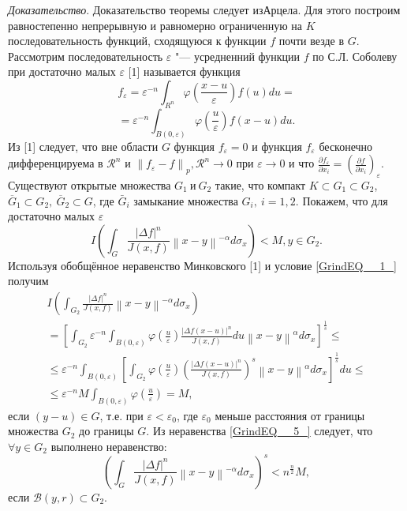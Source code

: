 \textit{Доказательство}. Доказательство теоремы следует из Арцела. Для этого построим равностепенно непрерывную и равномерно ограниченную на $K$ последовательность функций,
сходящуюся к функции $f$ почти везде в $G$. Рассмотрим последовательность $\varepsilon$ "--- усредненний функции $f$ по С.Л. Соболеву при достаточно малых $\varepsilon$ [1] называется функция 
$$
f_{\varepsilon } =\varepsilon ^{-n} \int _{R^{n} }\varphi \left(\frac{x-u}{\varepsilon } \right) f\left(u\right)du=
$$
$$
=\varepsilon ^{-n} \int _{B\left(0,\varepsilon \right)}\varphi \left(\frac{u}{\varepsilon } \right) f\left(x-u\right)du.
$$
Из [1] следует, что вне области $G$ функция $f_{\varepsilon }=0$ и функция $f_{\varepsilon }$ бесконечно дифференцируема в
${\mathcal{R}}^n$ и ${\left\|f_{\varepsilon }-f\right\|}_p,{\mathcal{R}}^n\rightarrow0$ при $\varepsilon \rightarrow0$ и что
$\frac{\partial f_{\varepsilon } }{\partial x_{i} } =\left(\frac{\partial f}{\partial x_{i} } \right)_{\varepsilon } $.
Существуют открытые множества $G_1\ \textrm{и}\ G_2$ такие, что компакт $K\subset G_1\subset G_2$, ${\overline{G}}_1\subset G_2,\ {\overline{G}}_2\subset G$,
где $\bar{G}_{i} $ замыкание множества $G_i,\ i=1,2.$ Покажем, что для достаточно малых $\varepsilon$
$$
I\left(\int _{G}\frac{\left|\Delta f\right|^{n} }{J\left(x,f\right)} \left\| x-y\right\| ^{-\alpha }  d\sigma _{x} \right)<M,y\in G_{2}.
$$
Используя обобщённое неравенство Минковского [1] и условие \ref{GrindEQ__1_} получим 
\begin{equation}\label{GrindEQ__5_} 
    \begin{gathered}
        I\left(\int _{G_{2} }\frac{\left|\Delta f\right|^{n} }{J\left(x,f\right)} \left\| x-y\right\| ^{-\alpha }  d\sigma _{x} \right) \\
        =\left[\int _{G_{2} }\varepsilon ^{-n} \int _{B\left(0,\varepsilon \right)}\varphi \left(\frac{u}{\varepsilon } \right)
        \frac{\left|\Delta f\left(x-u\right)\right|^{n} }{J\left(x,f\right)} du\left\| x-y\right\| ^{\alpha } d\sigma _{x}  \right]^{\frac{1}{s} } \leqslant \\
        \leqslant \varepsilon ^{-n}\!\!\int _{B\left(0,\varepsilon \right)}\left[\int _{G_{2} }\varphi \left(\frac{u}{\varepsilon } \right)
        \left(\frac{\left|\Delta f\left(x-u\right)\right|^{n} }{J\left(x,f\right)} \right)^{s} \left\| x-y\right\| ^{\alpha } d\sigma _{x} \right]^{\frac{1}{s}}\!du\!\leqslant \\
        \leqslant \varepsilon ^{-n} M\int _{B\left(0,\varepsilon \right)}\varphi \left(\frac{u}{\varepsilon } \right) =M,
    \end{gathered}
\end{equation}
если $\left(y-u\right)\in G$, т.е. при $\varepsilon <{\varepsilon }_0$, где ${\varepsilon }_0$ меньше расстояния от границы множества $G_2$ до границы $G$.
Из неравенства \ref{GrindEQ__5_} следует, что $\forall y\in G_2$ выполнено неравенство:
$$
\left(\int _{G}\frac{\left|\Delta f\right|^{n} }{J\left(x,f\right)} \left\| x-y\right\| ^{-\alpha }  d\sigma _{x} \right)^{s} <n^{\frac{n}{2} } M,
$$
если $\mathcal{B}(y,r)\subset G_2$.

